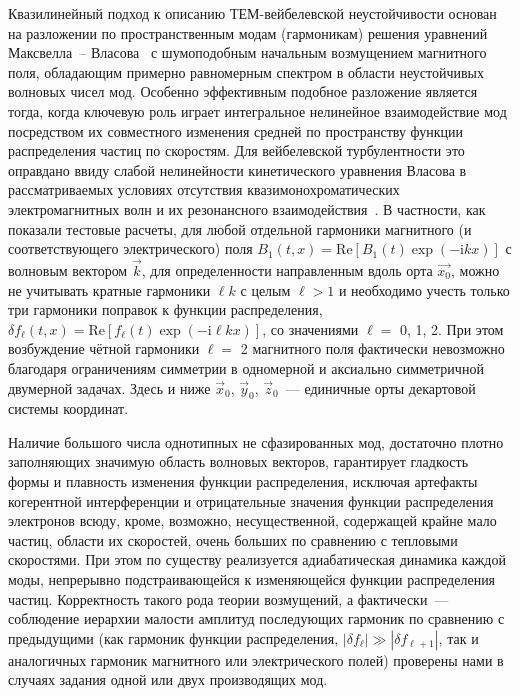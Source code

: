 Квазилинейный подход к описанию ТЕМ-вейбелевской неустойчивости основан на разложении по пространственным модам (гармоникам) решения уравнений  Максвелла~-- Власова~\cite{Baumjohann2012} с шумоподобным начальным возмущением магнитного поля, обладающим примерно равномерным спектром в области неустойчивых волновых чисел мод. Особенно эффективным подобное разложение является тогда, когда ключевую роль играет интегральное нелинейное взаимодействие мод посредством их совместного изменения средней по пространству функции распределения частиц по скоростям. Для вейбелевской турбулентности это оправдано ввиду слабой нелинейности кинетического уравнения Власова в рассматриваемых условиях отсутствия квазимонохроматических электромагнитных волн и их резонансного взаимодействия~\cite{Kuznetsov2022}. В частности, как показали тестовые расчеты, для любой отдельной гармоники магнитного (и соответствующего электрического) поля $B_1(t,x)= \mathrm{Re} \left[ B_1(t)\exp(-\mathrm{i}kx) \right]$ с волновым вектором $\vec{k}$, для определенности направленным вдоль орта $\vec{x_0}$, можно не учитывать кратные гармоники $\ell k$ с целым $\ell > 1$ и необходимо учесть только три гармоники поправок к функции распределения, $\delta f_\ell(t, x)=\mathrm{Re} \left[ f_\ell(t)\exp(-\mathrm{i}\ell kx) \right]$, со значениями $\ell =$ 0, 1, 2. При этом возбуждение чётной гармоники $\ell=$ 2 магнитного поля фактически невозможно благодаря ограничениям симметрии в одномерной и аксиально симметричной двумерной задачах. Здесь и ниже $\vec{x}_0$, $\vec{y}_0$, $\vec{z}_0$~--- единичные орты декартовой системы координат. 

Наличие большого числа однотипных не сфазированных мод, достаточно плотно заполняющих значимую область волновых векторов, гарантирует гладкость формы и плавность изменения функции распределения, исключая артефакты когерентной интерференции и отрицательные значения функции распределения электронов всюду, кроме, возможно, несущественной, содержащей крайне мало частиц, области их скоростей, очень больших по сравнению с тепловыми скоростями. При этом по существу реализуется адиабатическая динамика каждой моды, непрерывно подстраивающейся к изменяющейся функции распределения частиц. Корректность такого рода теории возмущений, а фактически~--- соблюдение иерархии малости амплитуд последующих гармоник по сравнению с предыдущими (как гармоник функции распределения, $|\delta f_ \ell|\gg |\delta f_{\ell+1}|$, так и аналогичных гармоник магнитного или электрического полей) проверены нами в случаях задания одной или двух производящих мод. 

